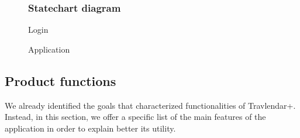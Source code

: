 \documentclass[12pt,titlepage]{article}
\begin{document}
 \clearpage
\newpage
 \begin{figure}
\subsubsection{Statechart diagram }\label{sec:mod1}
\centering
{}
\caption{Login}
\par
{}
\caption{Application}
\end{figure}

\clearpage
\newpage
 
\pagebreak 
\subsection{Product functions}\label{sec:mod1}
We already identified the goals that characterized functionalities of Travlendar+. Instead, in this section, we offer a specific list of the main features of the application in order to explain better its utility. 
\end{document}

